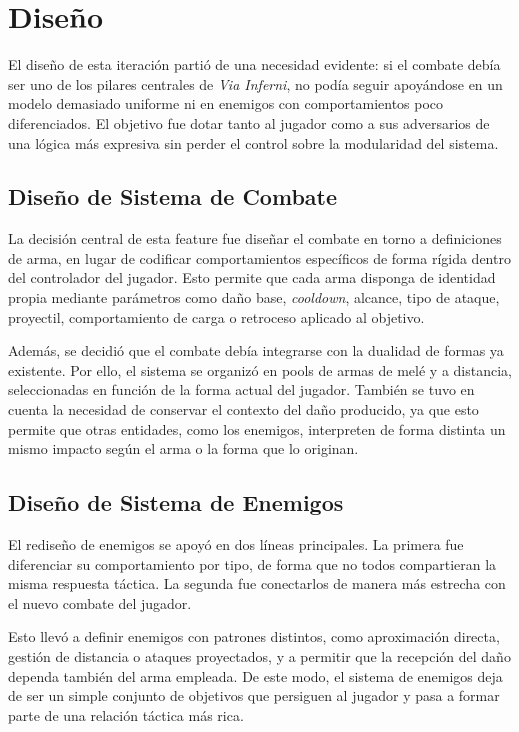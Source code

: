 \section{Diseño}
El diseño de esta iteración partió de una necesidad evidente: si el combate debía ser uno
de los pilares centrales de \textit{Via Inferni}, no podía seguir apoyándose en un modelo
demasiado uniforme ni en enemigos con comportamientos poco diferenciados. El objetivo fue
dotar tanto al jugador como a sus adversarios de una lógica más expresiva sin perder el
control sobre la modularidad del sistema.

\subsection{Diseño de Sistema de Combate}
La decisión central de esta feature fue diseñar el combate en torno a definiciones de arma,
en lugar de codificar comportamientos específicos de forma rígida dentro del controlador del
jugador. Esto permite que cada arma disponga de identidad propia mediante parámetros como
daño base, \textit{cooldown}, alcance, tipo de ataque, proyectil, comportamiento de carga o
retroceso aplicado al objetivo.

Además, se decidió que el combate debía integrarse con la dualidad de formas ya existente.
Por ello, el sistema se organizó en pools de armas de melé y a distancia, seleccionadas en
función de la forma actual del jugador. También se tuvo en cuenta la necesidad de conservar
el contexto del daño producido, ya que esto permite que otras entidades, como los enemigos,
interpreten de forma distinta un mismo impacto según el arma o la forma que lo originan.

\subsection{Diseño de Sistema de Enemigos}
El rediseño de enemigos se apoyó en dos líneas principales. La primera fue diferenciar su
comportamiento por tipo, de forma que no todos compartieran la misma respuesta táctica. La
segunda fue conectarlos de manera más estrecha con el nuevo combate del jugador.

Esto llevó a definir enemigos con patrones distintos, como aproximación directa, gestión de
distancia o ataques proyectados, y a permitir que la recepción del daño dependa también del
arma empleada. De este modo, el sistema de enemigos deja de ser un simple conjunto de
objetivos que persiguen al jugador y pasa a formar parte de una relación táctica más rica.

